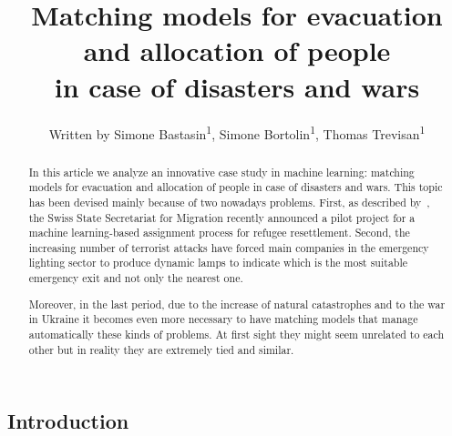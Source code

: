 \documentclass[letterpaper]{article} %
\title{Matching models for evacuation and allocation of people\\in case of disasters and wars}
\author{
    Written by Simone Bastasin\textsuperscript{\rm 1}, Simone Bortolin\textsuperscript{\rm 1}, Thomas Trevisan\textsuperscript{\rm 1}
    \\
}
\begin{document}
    \maketitle

    \begin{abstract}
        In this article we analyze an innovative case study in machine learning: matching models for evacuation and allocation of people in case of disasters and wars. This topic has been devised mainly because of two nowadays problems. First, as described by~\citet{olbergml}, the Swiss State Secretariat for Migration recently announced a pilot project for a machine learning-based assignment process for refugee resettlement. Second, the increasing number of terrorist attacks have forced main companies in the emergency lighting sector to produce dynamic lamps to indicate which is the most suitable emergency exit and not only the nearest one.

        Moreover, in the last period, due to the increase of natural catastrophes and to the war in Ukraine it becomes even more necessary to have matching models that manage automatically  these kinds of problems. At first sight they might seem unrelated to each other but in reality they are extremely tied and similar.
    \end{abstract}

    \subsection{Introduction}\label{introduction}
    ~\citet{olbergml,basshuysen,delacretaz_2020,andersson_2018,andersson_2016}
\end{document}
